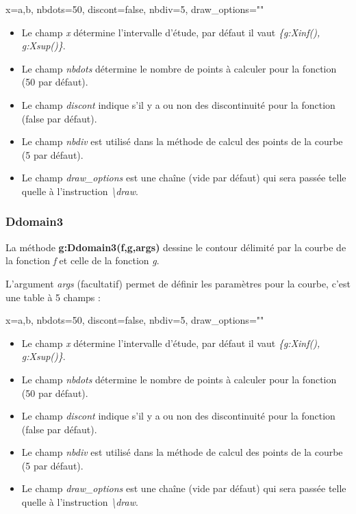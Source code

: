 \begin{TeXcode}
    { x={a,b}, nbdots=50, discont=false, nbdiv=5, draw_options="" }
\end{TeXcode}

\begin{itemize}
  \item Le champ \emph{x} détermine l'intervalle d'étude, par défaut il vaut \emph{\{g:Xinf(), g:Xsup()\}}.
  \item Le champ \emph{nbdots} détermine le nombre de points à calculer pour la fonction (50 par défaut).
  \item Le champ \emph{discont} indique s'il y a ou non des discontinuité pour la fonction (false par défaut).
  \item Le champ \emph{nbdiv} est utilisé dans la méthode de calcul des points de la courbe (5 par défaut).
  \item Le champ \emph{draw\_options} est une chaîne (vide par défaut) qui sera passée telle quelle à l'instruction \emph{\textbackslash draw}.
\end{itemize}
  
\subsubsection{Ddomain3}

La méthode \textbf{g:Ddomain3(f,g,args)} dessine le contour délimité par la courbe de la fonction \emph{f} et celle de la fonction \emph{g}.

L'argument \emph{args} (facultatif) permet de définir les paramètres pour la courbe, c'est une table à 5 champs : 

\begin{TeXcode}
    { x={a,b}, nbdots=50, discont=false, nbdiv=5, draw_options="" }
\end{TeXcode}

\begin{itemize}
  \item Le champ \emph{x} détermine l'intervalle d'étude, par défaut il vaut \emph{\{g:Xinf(), g:Xsup()\}}.
  \item Le champ \emph{nbdots} détermine le nombre de points à calculer pour la fonction (50 par défaut).
  \item Le champ \emph{discont} indique s'il y a ou non des discontinuité pour la fonction (false par défaut).
  \item Le champ \emph{nbdiv} est utilisé dans la méthode de calcul des points de la courbe (5 par défaut).
  \item Le champ \emph{draw\_options} est une chaîne (vide par défaut) qui sera passée telle quelle à l'instruction \emph{\textbackslash draw}.
\end{itemize}

